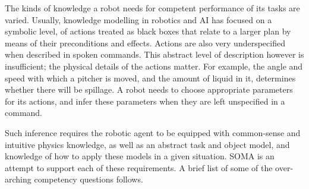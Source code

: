 
The kinds of knowledge a robot needs for competent performance of its tasks are varied. Usually, knowledge modelling in robotics and AI has focused on a symbolic level, of actions treated as black boxes that relate to a larger plan by means of their preconditions and effects. Actions are also very underspecified when described in spoken commands. This abstract level of description however is insufficient; the physical details of the actions matter. For example, the angle and speed with which a pitcher is moved, and the amount of liquid in it, determines whether there will be spillage. A robot needs to choose appropriate parameters for its actions, and infer these parameters when they are left unspecified in a command.

Such inference requires the robotic agent to be equipped with common-sense and intuitive physics knowledge, as well as an abstract task and object model, and knowledge of how to apply these models in a given situation. SOMA is an attempt to support each of these requirements. A brief list of some of the over-arching competency questions follows.

